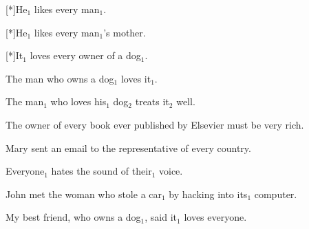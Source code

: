 \begin{exe}
  [*]{He$_1$ likes every man$_1$.
  \dotfill \pageref{ex:primary-crossover}}
\end{exe}

\begin{exe}
  [*]{He$_1$ likes every man$_1$'s mother.
  \dotfill \pageref{ex:secondary-crossover}}
\end{exe}

\begin{exe}
  [*]{It$_1$ loves every owner of a dog$_1$.
  \dotfill \pageref{ex:bad-crossover}}
\end{exe}

\begin{exe}
   The man who owns a dog$_1$ loves it$_1$.
  \dotfill \pageref{ex:presupposition-binding}
\end{exe}

\begin{exe}
   The man$_1$ who loves his$_1$ dog$_2$
  treats it$_2$ well.
  \dotfill \pageref{ex:presupposition-binding2}
\end{exe}

\begin{exe}
   The owner of every book ever
  published by Elsevier must be very rich.
  \dotfill \pageref{ex:presupposition-every-narrow}
\end{exe}

\begin{exe}
   Mary sent an email to the
  representative of every country.
  \dotfill \pageref{ex:presupposition-every-wide}
\end{exe}

\begin{exe}
   Everyone$_1$ hates the sound of their$_1$
  voice.
  \dotfill \pageref{ex:every-presupposition}
\end{exe}

\begin{exe}
   John met the woman who stole a car$_1$
  by hacking into its$_1$ computer.
  \dotfill \pageref{ex:binding-in-presupposition}
\end{exe}

\begin{exe}
   My best friend, who owns a dog$_1$, said it$_1$ loves everyone.
  \dotfill \pageref{ex:combo}
\end{exe}

